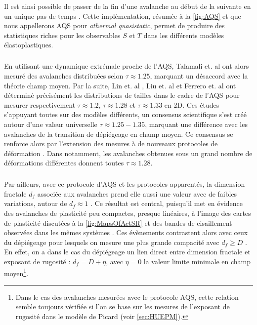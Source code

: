\noindent Il est ainsi possible de passer de la fin d'une avalanche au début de la suivante en un unique pas de temps \cite{lin_scaling_2014}. Cette implémentation, résumée à la \autoref{fig:AQS} et que nous appellerons AQS pour \textit{athermal quasistatic}, permet de produire des statistiques riches pour les observables $S$ et $T$ dans les différents modèles élastoplastiques.

\subparagraph{}En utilisant une dynamique extrémale proche de l'AQS, Talamali et. al \cite{talamali_avalanches_2011} ont alors mesuré des avalanches distribuées selon $\tau \approx 1.25$, marquant un désaccord avec la théorie champ moyen. Par la suite, Lin et. al \cite{lin_scaling_2014}, Liu et. al \cite{liu_driving_2016} et Ferrero et. al \cite{ferrero_criticality_2019} ont déterminé précisément les distributions de tailles dans le cadre de l'AQS pour mesurer respectivement $\tau \approx 1.2$, $\tau \approx 1.28$ et $\tau\approx 1.33$ en 2D. Ces études s'appuyant toutes sur des modèles différents, un consensus scientifique s'est créé autour d'une valeur universelle $\tau \approx 1.25-1.35$, marquant une différence avec les avalanches de la transition de dépiégeage en champ moyen. Ce consensus se renforce alors par l'extension des mesures à de nouveaux protocoles de déformation \cite{lin_scaling_2014, budrikis_universal_2017}. Dans \cite{budrikis_universal_2017} notamment, les avalanches obtenues sous un grand nombre de déformations différentes donnent toutes $\tau\approx1.28$. 

\subparagraph{}Par ailleurs, avec ce protocole d'AQS et les protocoles apparentés, la dimension fractale $d_f$ associée aux avalanches prend elle aussi une valeur avec de faibles variations, autour de $d_f \approx 1$ \cite{liu_driving_2016, lin_scaling_2014, ferrero_criticality_2019}. Ce résultat est central, puisqu'il met en évidence des avalanches de plasticité peu compactes, presque linéaires, à l'image des cartes de plasticité discutées à la \autoref{fig:MapsOfActSR} et des bandes de cisaillement observées dans les mêmes systèmes \cite{martens_spontaneous_2012}. Ces évènements contrastent alors avec ceux du dépiégeage pour lesquels on mesure une plus grande compacité avec $d_f \geq D$ \cite{wiese_theory_2022, le_priol_spatial_2021}. En effet, on a dans le cas du dépiégeage un lien direct entre dimension fractale et exposant de rugosité : $d_f = D + \eta$, avec $\eta = 0$ la valeur limite minimale en champ moyen\footnote{Dans le cas des avalanches mesurées avec le protocole AQS, cette relation semble toujours vérifiée si l'on se base sur les mesures de l'exposant de rugosité dans le modèle de Picard (voir \autoref{sec:HUEPM}).}.

